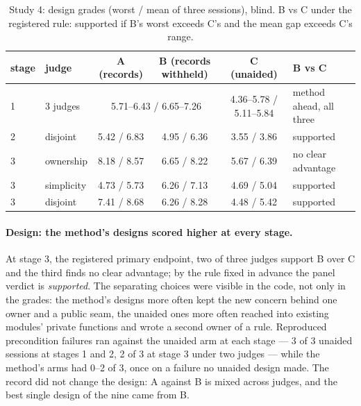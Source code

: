 \documentclass[11pt]{article}
\begin{document}
\begin{table}[h]
\centering\footnotesize\setlength{\tabcolsep}{4pt}
\caption{Study 4: design grades (worst / mean of three sessions), blind. B vs C under the registered rule: supported if B's worst exceeds C's and the mean gap exceeds C's range.}
\label{tab:scale}
\begin{tabular}{llccc l}
\toprule
stage & judge & A (records) & B (records withheld) & C (unaided) & B vs C \\
\midrule
1 & 3 judges & \multicolumn{2}{c}{5.71--6.43 / 6.65--7.26} & 4.36--5.78 / 5.11--5.84 & method ahead, all three \\
2 & disjoint & 5.42 / 6.83 & 4.95 / 6.36 & 3.55 / 3.86 & supported \\
3 & ownership & 8.18 / 8.57 & 6.65 / 8.22 & 5.67 / 6.39 & no clear advantage \\
3 & simplicity & 4.73 / 5.73 & 6.26 / 7.13 & 4.69 / 5.04 & supported \\
3 & disjoint & 7.41 / 8.68 & 6.26 / 8.28 & 4.48 / 5.42 & supported \\
\bottomrule
\end{tabular}
\end{table}

\paragraph{Design: the method's designs scored higher at every stage.} At stage 3, the registered primary endpoint, two of three judges support B over C and the third finds no clear advantage; by the rule fixed in advance the panel verdict is \emph{supported}. The separating choices were visible in the code, not only in the grades: the method's designs more often kept the new concern behind one owner and a public seam, the unaided ones more often reached into existing modules' private functions and wrote a second owner of a rule. Reproduced precondition failures ran against the unaided arm at each stage --- 3 of 3 unaided sessions at stages 1 and 2, 2 of 3 at stage 3 under two judges --- while the method's arms had 0--2 of 3, once on a failure no unaided design made. The record did not change the design: A against B is mixed across judges, and the best single design of the nine came from B.
\end{document}
